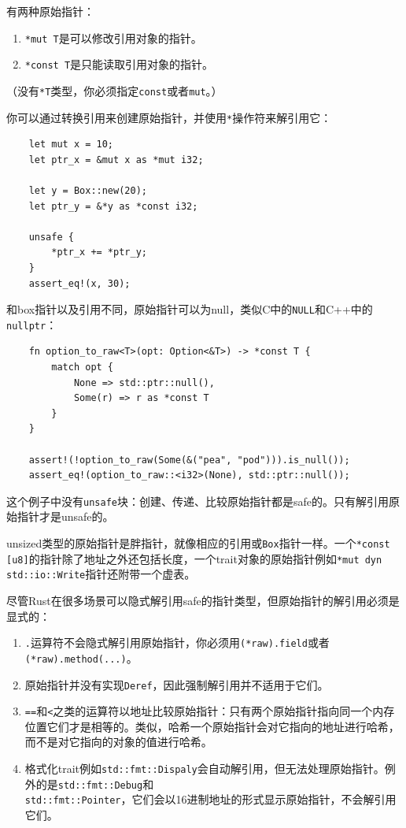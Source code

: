 有两种原始指针：
\begin{enumerate}
    \item \texttt{*mut T}是可以修改引用对象的指针。
    \item \texttt{*const T}是只能读取引用对象的指针。
\end{enumerate}
（没有\texttt{*T}类型，你必须指定\texttt{const}或者\texttt{mut}。）

你可以通过转换引用来创建原始指针，并使用\texttt{*}操作符来解引用它：
\begin{verbatim}
    let mut x = 10;
    let ptr_x = &mut x as *mut i32;

    let y = Box::new(20);
    let ptr_y = &*y as *const i32;

    unsafe {
        *ptr_x += *ptr_y;
    }
    assert_eq!(x, 30);
\end{verbatim}

和box指针以及引用不同，原始指针可以为null，类似C中的\texttt{NULL}和C++中的\texttt{nullptr}：
\begin{verbatim}
    fn option_to_raw<T>(opt: Option<&T>) -> *const T {
        match opt {
            None => std::ptr::null(),
            Some(r) => r as *const T
        }
    }

    assert!(!option_to_raw(Some(&("pea", "pod"))).is_null());
    assert_eq!(option_to_raw::<i32>(None), std::ptr::null());
\end{verbatim}

这个例子中没有\texttt{unsafe}块：创建、传递、比较原始指针都是safe的。只有解引用原始指针才是unsafe的。

unsized类型的原始指针是胖指针，就像相应的引用或\texttt{Box}指针一样。一个\texttt{*const [u8]}的指针除了地址之外还包括长度，一个trait对象的原始指针例如\texttt{*mut dyn std::io::Write}指针还附带一个虚表。

尽管Rust在很多场景可以隐式解引用safe的指针类型，但原始指针的解引用必须是显式的：
\begin{enumerate}
    \item \texttt{.}运算符不会隐式解引用原始指针，你必须用\texttt{(*raw).field}或者\texttt{(*raw).method(...)}。
    \item 原始指针并没有实现\texttt{Deref}，因此强制解引用并不适用于它们。
    \item \texttt{==}和\texttt{<}之类的运算符以地址比较原始指针：只有两个原始指针指向同一个内存位置它们才是相等的。类似，哈希一个原始指针会对它指向的地址进行哈希，而不是对它指向的对象的值进行哈希。
    \item 格式化trait例如\texttt{std::fmt::Dispaly}会自动解引用，但无法处理原始指针。例外的是\texttt{std::fmt::Debug}和\\
    \texttt{std::fmt::Pointer}，它们会以16进制地址的形式显示原始指针，不会解引用它们。
\end{enumerate}

